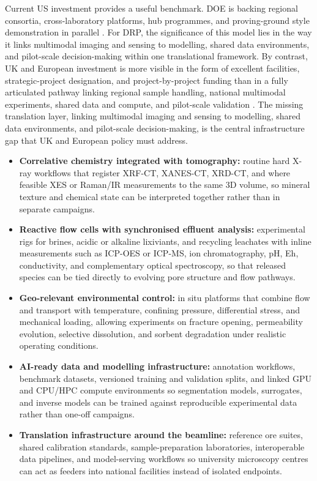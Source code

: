 \documentclass[12pt,a4paper]{article}
\begin{document}
Current US investment provides a useful benchmark. DOE is backing regional consortia, cross-laboratory platforms, hub programmes, and proving-ground style demonstration in parallel \cite{doe_regional_consortia_2025, doe_cmi_2025, doe_metallic_2024, doe_motf_launch_2025}. For DRP, the significance of this model lies in the way it links multimodal imaging and sensing to modelling, shared data environments, and pilot-scale decision-making within one translational framework. By contrast, UK and European investment is more visible in the form of excellent facilities, strategic-project designation, and project-by-project funding than in a fully articulated pathway linking regional sample handling, national multimodal experiments, shared data and compute, and pilot-scale validation \cite{eu_strategic_projects_2025, uk_vision_2035_2026}. The missing translation layer, linking multimodal imaging and sensing to modelling, shared data environments, and pilot-scale decision-making, is the central infrastructure gap that UK and European policy must address.

\begin{itemize}
\item \textbf{Correlative chemistry integrated with tomography:} routine hard X-ray workflows that register XRF-CT, XANES-CT, XRD-CT, and where feasible XES or Raman/IR measurements to the same 3D volume, so mineral texture and chemical state can be interpreted together rather than in separate campaigns.
\item \textbf{Reactive flow cells with synchronised effluent analysis:} experimental rigs for brines, acidic or alkaline lixiviants, and recycling leachates with inline measurements such as ICP-OES or ICP-MS, ion chromatography, pH, Eh, conductivity, and complementary optical spectroscopy, so that released species can be tied directly to evolving pore structure and flow pathways.
\item \textbf{Geo-relevant environmental control:} in situ platforms that combine flow and transport with temperature, confining pressure, differential stress, and mechanical loading, allowing experiments on fracture opening, permeability evolution, selective dissolution, and sorbent degradation under realistic operating conditions.
\item \textbf{AI-ready data and modelling infrastructure:} annotation workflows, benchmark datasets, versioned training and validation splits, and linked GPU and CPU/HPC compute environments so segmentation models, surrogates, and inverse models can be trained against reproducible experimental data rather than one-off campaigns.
\item \textbf{Translation infrastructure around the beamline:} reference ore suites, shared calibration standards, sample-preparation laboratories, interoperable data pipelines, and model-serving workflows so university microscopy centres can act as feeders into national facilities instead of isolated endpoints.
\end{itemize}
\end{document}
